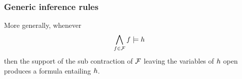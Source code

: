 \subsubsection{Generic inference rules}

More generally, whenever
\begin{align*}
    \bigwedge_{f\in\mathcal{F}} f \models h
\end{align*}
then the support of the sub contraction of $\mathcal{F}$ leaving the variables of $h$ open produces a formula entailing $h$.

